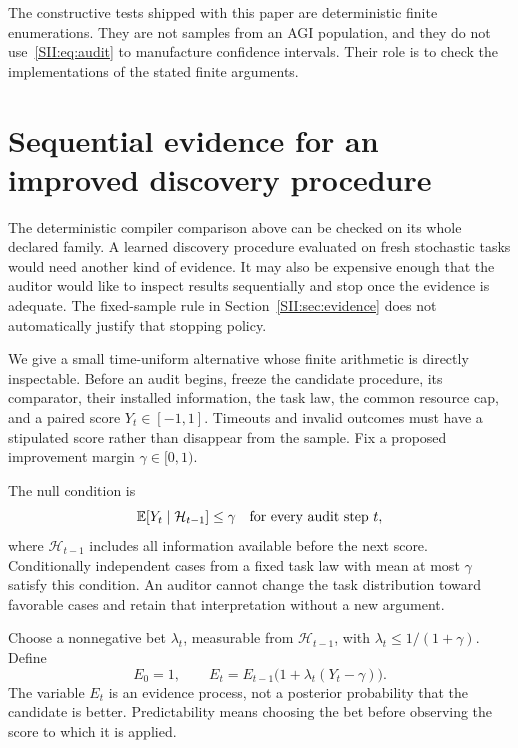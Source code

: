 The constructive tests shipped with this paper are deterministic finite enumerations. They are not samples from an AGI population, and they do not use~\eqref{SII:eq:audit} to manufacture confidence intervals. Their role is to check the implementations of the stated finite arguments.

\section{Sequential evidence for an improved discovery procedure}\label{SII:sec:anytime}
The deterministic compiler comparison above can be checked on its whole declared family. A learned discovery procedure evaluated on fresh stochastic tasks would need another kind of evidence. It may also be expensive enough that the auditor would like to inspect results sequentially and stop once the evidence is adequate. The fixed-sample rule in Section~\ref{SII:sec:evidence} does not automatically justify that stopping policy.

We give a small time-uniform alternative whose finite arithmetic is directly inspectable. Before an audit begins, freeze the candidate procedure, its comparator, their installed information, the task law, the common resource cap, and a paired score $Y_t\in[-1,1]$. Timeouts and invalid outcomes must have a stipulated score rather than disappear from the sample. Fix a proposed improvement margin $\gamma\in[0,1)$.

The null condition is
\begin{equation}\label{SII:eq:anytime-null}
\mathbb E[Y_t\mid\mathcal H_{t-1}]\leq\gamma
\quad\text{for every audit step }t,
\end{equation}
where $\mathcal H_{t-1}$ includes all information available before the next score. Conditionally independent cases from a fixed task law with mean at most $\gamma$ satisfy this condition. An auditor cannot change the task distribution toward favorable cases and retain that interpretation without a new argument.

Choose a nonnegative bet $\lambda_t$, measurable from $\mathcal H_{t-1}$, with $\lambda_t\leq1/(1+\gamma)$. Define
\begin{equation}\label{SII:eq:anytime-capital}
E_0=1,\qquad E_t=E_{t-1}\bigl(1+\lambda_t(Y_t-\gamma)\bigr).
\end{equation}
The variable $E_t$ is an evidence process, not a posterior probability that the candidate is better. Predictability means choosing the bet before observing the score to which it is applied.


